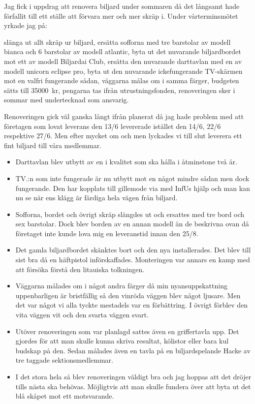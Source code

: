 \documentclass[../_main/handlingar.tex]{subfiles}
\begin{document}

    Jag fick i uppdrag att renovera biljard under sommaren då det långsamt hade förfallit till ett ställe att förvara mer och mer skräp i. Under vårterminsmötet yrkade jag på:

\begin{attsatser}
    \att slänga ut allt skräp ur biljard,
    \att ersätta sofforna med tre barstolar av modell bianca och 6 barstolar av modell atlantic,
    \att byta ut det nuvarande biljardbordet mot ett av modell Biljardai Club,
    \att ersätta den nuvarande darttavlan med en av modell unicorn eclipse pro,
    \att byta ut den nuvarande ickefungerande TV-skärmen mot en valfri fungerande sådan,
    \att väggarna målas om i samma färger,
    \att budgeten sätts till \SI{35000}{kr},
    \att pengarna tas ifrån utrustningsfonden,
    \att renoveringen sker i sommar med undertecknad som ansvarig.
\end{attsatser} 

Renoveringen gick väl ganska långt ifrån planerat då jag hade problem med att företagen
som lovat leverans den 13/6 levererade istället den 14/6, 22/6 respektive 27/6. Men efter
mycket om och men lyckades vi till slut leverera ett fint biljard till våra medlemmar.

\begin{itemize}
  \item Darttavlan blev utbytt av en i kvalitet som ska hålla i åtminstone två år.
  \item TV.:n som inte fungerade är nu utbytt mot en något mindre sådan men dock fungerande. Den har kopplats till gillemode via med InfUs hjälp och man kan nu se när ens klägg är färdiga hela vägen från biljard.
  \item Sofforna, bordet och övrigt skräp slängdes ut och ersattes med tre bord och sex barstolar. Dock blev borden av en annan modell än de beskrivna ovan då företaget inte kunde lova mig en leveranstid innan den 25/8.
\item Det gamla biljardbordet skänktes bort och den nya installerades. Det blev till sist bra då en häftpistol införskaffades. Monteringen var annars en kamp med att försöka förstå den litauiska tolkningen.
\item Väggarna målades om i något andra färger då min nyansuppskattning uppenbarligen är bristfällig så den vinröda väggen blev något ljusare. Men det var något vi alla tyckte mestadels var en förbättring. I övrigt förblev den vita väggen vit och den svarta väggen svart.
\item Utöver renoveringen som var planlagd sattes även en griffertavla upp. Det gjordes för att man skulle kunna skriva resultat, kölistor eller bara kul budskap på den. Sedan målades även en tavla på en biljardspelande Hacke av tre taggade sektionsmedlemmar.
\item I det stora hela så blev renoveringen väldigt bra och jag hoppas att det dröjer tills nästa ska behövas. Möjligtvis att man skulle fundera över att byta ut det blå skåpet mot ett motsvarande.
\end{itemize}
\end{document}
